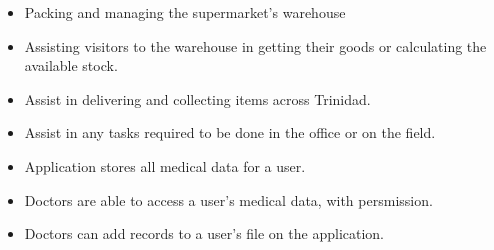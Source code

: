 \documentclass[10pt,a4paper]{altacv}
\begin{document}

\begin{fullwidth}
\makecvheader
\end{fullwidth}


\begin{itemize}
\item Packing and managing the supermarket's warehouse 
\item Assisting visitors to the warehouse in getting their goods or calculating the available stock. 
\end{itemize}

\divider

\begin{itemize}
\item Assist in delivering and collecting items across Trinidad.
\item Assist in any tasks required to be done in the office or on the field.
\end{itemize}


\begin{itemize}
\item Application stores all medical data for a user.
\item Doctors are able to access a user's medical data, with persmission.
\item Doctors can add records to a user's file on the application.
\end{itemize}
\end{document}
